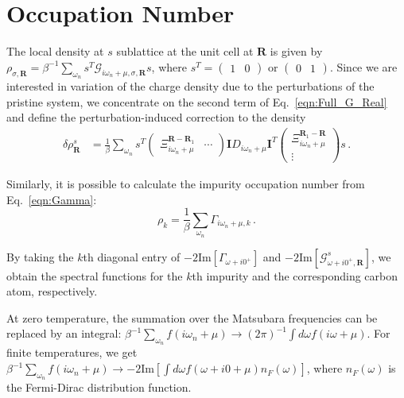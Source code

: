 \documentclass[aps, prb, superscriptaddress, preprint, floatfix]{revtex4-1}
\begin{document}
\section{Occupation Number}

The local density at $s$ sublattice at the unit cell at $\mathbf{R}$ is given by $\rho_{\sigma,\mathbf{R}} = \beta^{-1}\sum_{\omega_n}s^T \mathcal{G}_{i\omega_n + \mu,\sigma,\mathbf{R}}s$, where $s^T = \begin{pmatrix}
	1 &0
\end{pmatrix}$ or $\begin{pmatrix}
	0&1
\end{pmatrix}$. Since we are interested in variation of the charge density due to the perturbations of the pristine system, we concentrate on the second term of Eq.~\eqref{eqn:Full_G_Real} and define the perturbation-induced correction to the density
%
\begin{align}
	\delta \rho_{\mathbf{R}}^s
	 & =
    \frac{1}{\beta}\sum_{\omega_n}
	s^T\begin{pmatrix}
	 	\Xi_{i\omega_n + \mu}^{\mathbf{R} - \mathbf{R}_1} & \cdots
	 \end{pmatrix}
	 \mathbf{I} 
	 D_{i\omega_n + \mu}
	 \mathbf{I}^T
	 \begin{pmatrix}
	 	\Xi_{i\omega_n + \mu}^{\mathbf{R}_1 - \mathbf{R}} \\ \vdots
	 \end{pmatrix}
	s
	\,.
	\label{eqn:Delta_rho}
\end{align}
%

Similarly, it is possible to calculate the impurity occupation number from Eq.~\eqref{eqn:Gamma}:
%
\begin{equation}
    \rho_{k}= \frac{1}{\beta}\sum_{\omega_n} \Gamma_{i\omega_n + \mu, k}  \,.
    \label{eqn:rho_imp}
\end{equation}
%


By taking the $k$th diagonal entry of $-2\mathrm{Im}\left[\Gamma_{\omega + i0^+}\right]$ and $-2\mathrm{Im}\left[\mathcal{G}_{\omega+i0^+,\mathbf{R}}^s\right]$, we obtain the spectral functions for the $k$th impurity and the corresponding carbon atom, respectively. 

At zero temperature, the summation over the Matsubara frequencies can be replaced by an integral: $\beta^{-1}\sum_{\omega_n} f(i\omega_n + \mu)\rightarrow (2\pi)^{-1} \int d\omega f(i\omega + \mu)$. For finite temperatures, we get $\beta^{-1}\sum_{\omega_n} f(i\omega_n + \mu)\rightarrow -2 \mathrm{Im}\left[\int d\omega f(\omega + i0 + \mu)n_F(\omega)\right]$, where $n_F(\omega)$ is the Fermi-Dirac distribution function.
\end{document}
